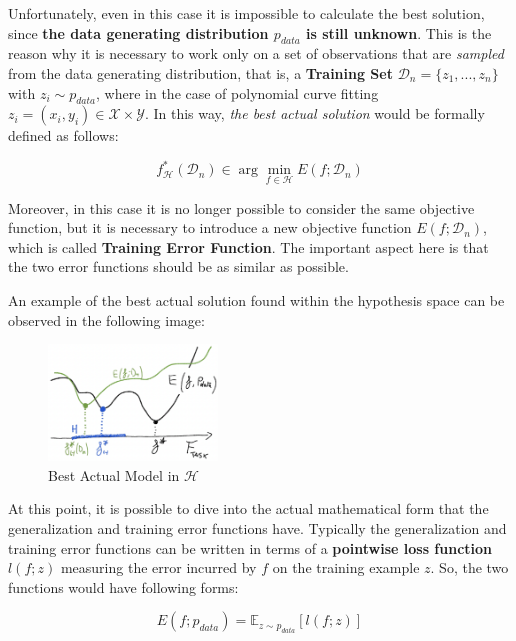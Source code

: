 Unfortunately, even in this case it is impossible to calculate the best solution,
since \textbf{the data generating distribution $p_{data}$ is still unknown}. This
is the reason why it is necessary to work only on a set of observations that are
\emph{sampled} from the data generating distribution, that is, a \textbf{Training Set}
$\mathcal{D}_n = \{z_1,...,z_n\}$ with $z_i \sim p_{data}$, where in the case of
polynomial curve fitting $z_i = (x_i,y_i) \in \mathcal{X} \times \mathcal{Y}$.
In this way, \emph{the best actual solution} would be formally defined as follows:

\newpage

\begin{equation*}
      f_{\mathcal{H}}^*(\mathcal{D}_n) \in \arg \min_{f \in \mathcal{H}} E(f; \mathcal{D}_n)
\end{equation*}

Moreover, in this case it is no longer possible to consider the same objective
function, but it is necessary to introduce a new objective function $E(f; \mathcal{D}_n)$,
which is called \textbf{Training Error Function}. The important aspect here is that
the two error functions should be as similar as possible.

An example of the best actual solution found within the hypothesis space can be observed
in the following image:

\begin{figure}[h]
      \centering
      \includegraphics[width=0.4\textwidth]{../img/Best_actual_model}
      \caption{Best Actual Model in $\mathcal{H}$}
\end{figure}

At this point, it is possible to dive into the actual mathematical form that the
generalization and training error functions have. Typically the generalization and
training error functions can be written in terms of a \textbf{pointwise loss function}
$l(f;z)$ measuring the error incurred by $f$ on the training example $z$. So, the two
functions would have following forms:

\begin{equation*}
      E(f; p_{data}) = \mathbb{E}_{z \sim p_{data}}[l(f;z)]
\end{equation*}

